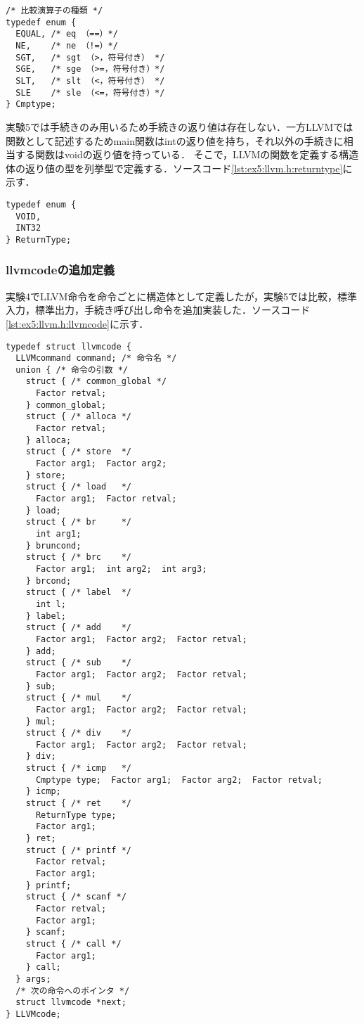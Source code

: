 \documentclass[uplatex]{jsarticle}
\begin{document}
\begin{lstlisting}[caption=比較の種別を表す列挙型Cmptype,label=lst:ex5:llvm.h:cmptype]
/* 比較演算子の種類 */
typedef enum {
  EQUAL, /* eq （==）*/
  NE,    /* ne （!=）*/
  SGT,   /* sgt （>，符号付き） */
  SGE,   /* sge （>=，符号付き）*/
  SLT,   /* slt （<，符号付き） */
  SLE    /* sle （<=，符号付き）*/
} Cmptype;
\end{lstlisting}

実験5では手続きのみ用いるため手続きの返り値は存在しない．一方LLVMでは関数として記述するためmain関数はintの返り値を持ち，それ以外の手続きに相当する関数はvoidの返り値を持っている．\cite{compiler2}
そこで，LLVMの関数を定義する構造体の返り値の型を列挙型で定義する．ソースコード\ref{lst:ex5:llvm.h:returntype}に示す．

\begin{lstlisting}[caption=ReturnTypeの定義,label=lst:ex5:llvm.h:returntype]
typedef enum {
  VOID,
  INT32
} ReturnType;
\end{lstlisting}

\subsubsection {llvmcodeの追加定義}

実験4でLLVM命令を命令ごとに構造体として定義したが，実験5では比較，標準入力，標準出力，手続き呼び出し命令を追加実装した．ソースコード\ref{lst:ex5:llvm.h:llvmcode}に示す．

\begin{lstlisting}[caption=LLVMコードの追加実装,label=lst:ex5:llvm.h:llvmcode]
typedef struct llvmcode {
  LLVMcommand command; /* 命令名 */
  union { /* 命令の引数 */
    struct { /* common_global */
      Factor retval;
    } common_global;
    struct { /* alloca */
      Factor retval;
    } alloca;
    struct { /* store  */
      Factor arg1;  Factor arg2;
    } store;
    struct { /* load   */
      Factor arg1;  Factor retval;
    } load;
    struct { /* br     */
      int arg1;
    } bruncond;
    struct { /* brc    */
      Factor arg1;  int arg2;  int arg3;
    } brcond;
    struct { /* label  */
      int l;
    } label;
    struct { /* add    */
      Factor arg1;  Factor arg2;  Factor retval;
    } add;
    struct { /* sub    */
      Factor arg1;  Factor arg2;  Factor retval;
    } sub;
    struct { /* mul    */
      Factor arg1;  Factor arg2;  Factor retval;
    } mul;
    struct { /* div    */
      Factor arg1;  Factor arg2;  Factor retval;
    } div;
    struct { /* icmp   */
      Cmptype type;  Factor arg1;  Factor arg2;  Factor retval;
    } icmp;
    struct { /* ret    */
      ReturnType type;
      Factor arg1;
    } ret;
    struct { /* printf */
      Factor retval;
      Factor arg1;
    } printf;
    struct { /* scanf */
      Factor retval;
      Factor arg1;
    } scanf;
    struct { /* call */
      Factor arg1;
    } call;
  } args;
  /* 次の命令へのポインタ */
  struct llvmcode *next;
} LLVMcode;
\end{lstlisting}
\end{document}
